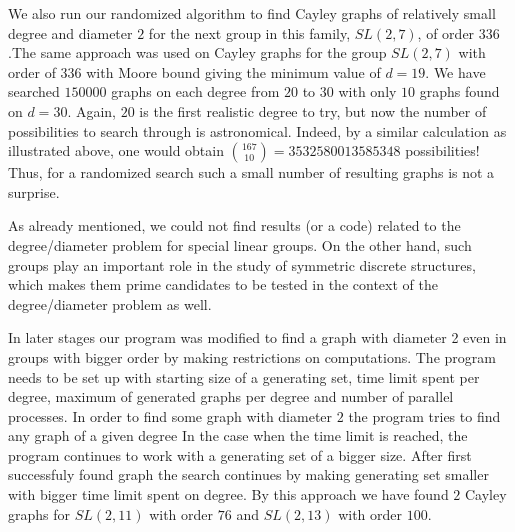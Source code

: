 \documentclass[a4paper,12pt,oneside]{report}%
\begin{document}
 We also run our randomized algorithm to find Cayley graphs of relatively small degree and diameter $2$ for the next group in this family, $SL(2,7)$, of order $336$.The same approach was used on Cayley graphs for the group $SL(2,7)$ with order of $336$ with Moore bound giving the minimum value of $d=19$. We have searched $150000$ graphs on each degree from $20$ to $30$ with only $10$ graphs found on $d=30$. Again, $20$ is the first realistic degree to try, but now the number of possibilities to search through is astronomical. Indeed, by a similar calculation as illustrated above, one would obtain ${167\choose 10} = 3532580013585348$ possibilities! Thus, for a randomized search such a small number of resulting graphs is not a surprise.

As already mentioned, we could not find results (or a code) related to the degree/diameter problem for special linear groups. On the other hand, such groups play an     important role in the study of symmetric discrete structures, which makes them prime candidates to be tested in the context of the degree/diameter problem as well.

In later stages our program was modified to find a graph with diameter 2 even in groups with bigger order by making restrictions on computations. The program needs to be set up with starting size of a generating set, time limit spent per degree, maximum of generated graphs per degree and number of parallel processes. In order to find some graph with diameter $2$ the program tries to find any graph of a given  degree In the case when the time limit is reached, the program continues to work with a generating set of a bigger size. After first successfuly found graph the search continues by making generating set smaller with bigger time limit spent on degree.
By this approach we have found $2$ Cayley graphs for $SL(2,11)$ with order $76$ and $SL(2,13)$ with order $100$. 
\end{document}
